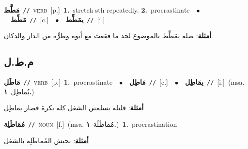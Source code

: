 \documentclass[10pt,a4paper,twoside]{article} %
\begin{document}
\begin{multicols}{2}
{\setlength\topsep{0pt}\textbf{\foreignlanguage{arabic}{مَطَّط}}\ {\color{gray}\texttt{//}\color{black}}\ \textsc{verb}\ [p.]\ \textbf{1.}~stretch sth repeatedly.  \textbf{2.}~procrastinate\ \ $\bullet$\ \ \setlength\topsep{0pt}\textbf{\foreignlanguage{arabic}{مَطِّط}}\ {\color{gray}\texttt{//}\color{black}}\ [c.]\ \ $\bullet$\ \ \setlength\topsep{0pt}\textbf{\foreignlanguage{arabic}{يمَطِّط}}\ {\color{gray}\texttt{//}\color{black}}\ [i.]\  \begin{flushright}\color{gray}\foreignlanguage{arabic}{\textbf{\underline{\foreignlanguage{arabic}{أمثلة}}}: ضله يمَطِّط بالموضوع لحد ما فقعت مع أبوه وطرُّه من الدار والدكان}\end{flushright}\color{black}} \vspace{2mm}

\vspace{-3mm}
\subsection*{\color{blue}\foreignlanguage{arabic}{م.ط.ل}\color{blue}{}} 

{\setlength\topsep{0pt}\textbf{\foreignlanguage{arabic}{مَاطَل}}\ {\color{gray}\texttt{//}\color{black}}\ \textsc{verb}\ [p.]\ \textbf{1.}~procrastinate\ \ $\bullet$\ \ \setlength\topsep{0pt}\textbf{\foreignlanguage{arabic}{مَاطِل}}\ {\color{gray}\texttt{//}\color{black}}\ [c.]\ \ $\bullet$\ \ \setlength\topsep{0pt}\textbf{\foreignlanguage{arabic}{يمَاطِل}}\ {\color{gray}\texttt{//}\color{black}}\ [i.]\ \color{gray}(msa. \foreignlanguage{arabic}{يُماطِل}~\foreignlanguage{arabic}{\textbf{١.}})\color{black}\  \begin{flushright}\color{gray}\foreignlanguage{arabic}{\textbf{\underline{\foreignlanguage{arabic}{أمثلة}}}: قلتله يسلمني الشغل كله بكرة فصار يماطِل}\end{flushright}\color{black}} \vspace{2mm}

{\setlength\topsep{0pt}\textbf{\foreignlanguage{arabic}{مُمَاطَلِة}}\ {\color{gray}\texttt{//}\color{black}}\ \textsc{noun}\ [f.]\ \color{gray}(msa. \foreignlanguage{arabic}{مُماطَلَة}~\foreignlanguage{arabic}{\textbf{١.}})\color{black}\ \textbf{1.}~procrastination\  \begin{flushright}\color{gray}\foreignlanguage{arabic}{\textbf{\underline{\foreignlanguage{arabic}{أمثلة}}}: بحبش المُماطَلِة بالشغل}\end{flushright}\color{black}} \vspace{2mm}


\end{multicols}
\end{document}
